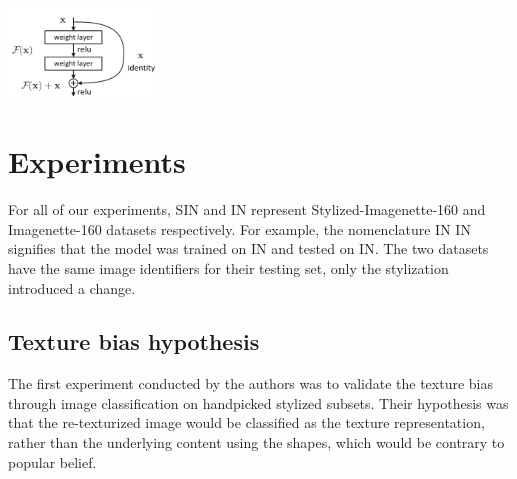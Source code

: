 \documentclass{article}
\begin{document}
\begin{center}
  \captionsetup{type=figure}
  \includegraphics[width=0.3\textwidth]{imgs/resnet/residual-block}
  \label{resnet-res-block}
\end{center}








\newpage
\section{Experiments}

For all of our experiments, SIN and IN represent Stylized-Imagenette-160 and Imagenette-160 datasets respectively.
For example, the nomenclature IN \texorpdfstring{\textrightarrow} .IN signifies that the 
model was trained on IN and tested on IN.
The two datasets have the same image identifiers for their testing set, only the stylization introduced a change.

\subsection{Texture bias hypothesis}

The first experiment conducted by the authors was to validate the texture bias 
through image classification on handpicked stylized subsets. 
Their hypothesis was that the re-texturized image would be classified as the texture representation, rather than 
the underlying content using the shapes, which would be contrary to popular belief. \medskip \par
\end{document}
